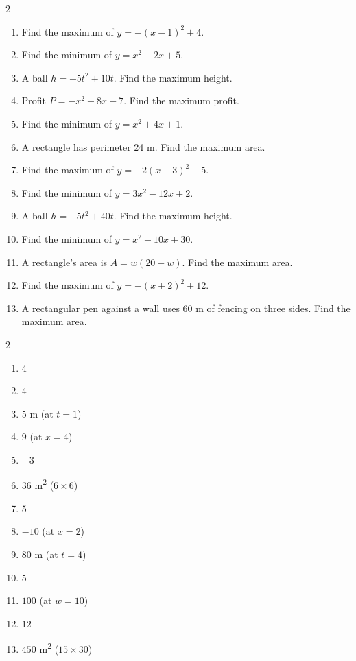\documentclass[11pt]{article}
\begin{document}
\clearpage
{}

\begin{recapbox}
\begin{multicols}{2}
\small
\begin{enumerate}[leftmargin=*,itemsep=3pt]
  \item Find the maximum of $y=-(x-1)^2+4$.
  \item Find the minimum of $y=x^2-2x+5$.
  \item A ball $h=-5t^2+10t$. Find the maximum height.
  \item Profit $P=-x^2+8x-7$. Find the maximum profit.
  \item Find the minimum of $y=x^2+4x+1$.
  \item A rectangle has perimeter 24 m. Find the maximum area.
  \item Find the maximum of $y=-2(x-3)^2+5$.
  \item Find the minimum of $y=3x^2-12x+2$.
  \item A ball $h=-5t^2+40t$. Find the maximum height.
  \item Find the minimum of $y=x^2-10x+30$.
  \item A rectangle's area is $A=w(20-w)$. Find the maximum area.
  \item Find the maximum of $y=-(x+2)^2+12$.
  \item A rectangular pen against a wall uses 60 m of fencing on three sides. Find the maximum area.
\end{enumerate}
\end{multicols}
\end{recapbox}

\begin{keybox}
\begin{multicols}{2}
\small
\begin{enumerate}[leftmargin=*,itemsep=3pt]
  \item $4$
  \item $4$
  \item $5$ m (at $t=1$)
  \item $9$ (at $x=4$)
  \item $-3$
  \item $36$ m\textsuperscript{2} ($6\times6$)
  \item $5$
  \item $-10$ (at $x=2$)
  \item $80$ m (at $t=4$)
  \item $5$
  \item $100$ (at $w=10$)
  \item $12$
  \item $450$ m\textsuperscript{2} ($15\times30$)
\end{enumerate}
\end{multicols}
\end{keybox}
\end{document}
